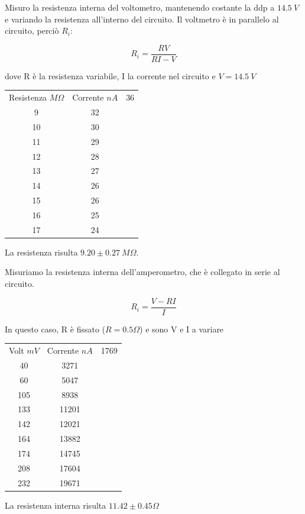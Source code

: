 Misuro la resistenza interna del voltometro, mantenendo costante la ddp a $14.5\ V$ e variando la resistenza all'interno del circuito. 
Il voltmetro è in parallelo al circuito, perciò $R_i$:

$$R_i = \frac{RV}{RI-V} $$

dove R è la resistenza variabile, I la corrente nel circuito e $V= 14.5\ V$

\begin{center}
\begin{tabular}{*{2}{c}}
Resistenza $M\Omega$ & Corrente $nA$
&      36\\
9&      32\\
10& 30\\
11&     29\\
12&     28\\
13&     27\\
14&     26\\
15&     26\\
16&     25\\
17&     24\\

\end{tabular}

La resistenza risulta $9.20 \pm 0.27 \ M \Omega$.


Misuriamo la resistenza interna dell'amperometro, che è collegato in serie al circuito. 

$$R_i = \frac{V-RI}{I}$$

In questo caso, R è fissato ($R=0.5 \Omega$) e sono V e I a variare
\begin{tabular}{*{2}{c}}
Volt $mV$ & Corrente $nA$
&      1769\\
40&      3271\\
60&      5047\\
105&     8938\\
133&     11201\\
142&     12021\\
164&     13882\\
174&     14745\\
208&     17604\\
232&     19671\\



\end{tabular}

La resistenza interna risulta $11.42 \pm 0.45 \Omega$


\end{center}


